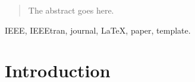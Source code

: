 \documentclass[journal]{IEEEtran}
\begin{document}







\maketitle

\begin{abstract}
The abstract goes here.
\end{abstract}

\begin{IEEEkeywords}
IEEE, IEEEtran, journal, \LaTeX, paper, template.
\end{IEEEkeywords}






%
\IEEEpeerreviewmaketitle



\section{Introduction}
% 
% 
% 
% 
\end{document}
